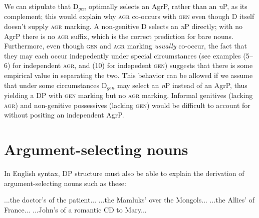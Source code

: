 \documentclass[letterpaper,12pt]{article}
\newcommand{\posst}{\textsc{agr}}
\newcommand{\gen}{\textsc{gen}}
\begin{document}
We can stipulate that D$_{gen}$ optimally selects an AgrP, rather than an \textit{n}P, as its complement; this would explain why \posst{} co-occurs with \gen{} even though
D itself doesn't supply \posst{} marking. A non-genitive D selects an \textit{n}P directly; with no AgrP there is no \posst{} suffix, which is the correct prediction for bare nouns. Furthermore, even though \gen{} and \posst{}
marking \emph{usually} co-occur, the fact that they may each occur indepedently under special circumstances (see examples (5--6) for independent \posst, and (10)
for indepedent \gen) suggests that there is some empirical value in separating the two. This behavior can be allowed if we assume that
under some circumstances D$_{gen}$ may select an \textit{n}P instead of an AgrP, thus yielding a DP with
\gen{} marking but no \posst{} marking. Informal genitives (lacking \posst) and non-genitive possessives (lacking \gen) would be
difficult to account for without positing an independent AgrP.


\section{Argument-selecting nouns}
In English syntax, DP structure must also be able to explain the derivation of argument-selecting nouns such as these:
\begin{exe}
\ex
	\begin{xlist}
	\ex ...the doctor's  of the patient...
	\ex ...the Mamluks'  over the Mongols...
	\ex ...the Allies'  of France...
	\ex ...John's  of a romantic CD to Mary...
	\end{xlist}
\end{exe}
\end{document}
